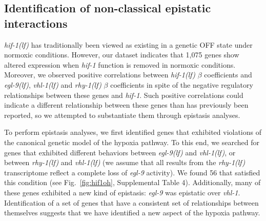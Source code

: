 \documentclass[9pt,twocolumn,twoside,lineno]{pnas-new}
\newcommand{\gene}[1]{\emph{#1}}
\newcommand{\egl}{\emph{\mbox{egl-9}(lf)}}
\newcommand{\rhy}{\emph{\mbox{rhy-1}(lf)}}
\newcommand{\vhl}{\emph{\mbox{vhl-1}(lf)}}
\newcommand{\hif}{\emph{\mbox{hif-1(lf)}}}
\newcommand{\hifn}{1,075}
\newcommand{\hifohtargets}{56}
\begin{document}
\subsection*{Identification of non-classical epistatic interactions}
\label{sub:hifoh}
\hif{} has traditionally been viewed as existing in a genetic OFF state under
normoxic conditions. However, our dataset indicates that \hifn{} genes show
altered expression when \gene{hif-1} function is removed in normoxic conditions.
Moreover, we observed positive correlations between \hif{} $\beta$ coefficients
and \egl{}, \vhl{} and \rhy{} $\beta$ coefficients in spite of the negative
regulatory relationships between these genes and \gene{hif-1}. Such positive
correlations could indicate a different relationship between these genes than has
previously been reported, so we attempted to substantiate them through epistasis
analyses.

To perform epistasis analyses, we first identified genes that exhibited violations
of the canonical genetic model of the hypoxia pathway. To this end, we searched
for genes that exhibited different behaviors between \egl{} and \vhl{}, or
between \rhy{} and \vhl{} (we assume that all results from the \rhy{}
transcriptome reflect a complete loss of \gene{egl-9} activity). We found
\hifohtargets{} that satisfied this condition (see Fig.~\ref{fig:hif1oh},
Supplemental Table 4). Additionally, many of these genes exhibited a new kind of
epistasis: \gene{egl-9} was epistatic over \gene{vhl-1}. Identification of a set
of genes that have a consistent set of relationships between themselves suggests
that we have identified a new aspect of the hypoxia pathway.
\end{document}
